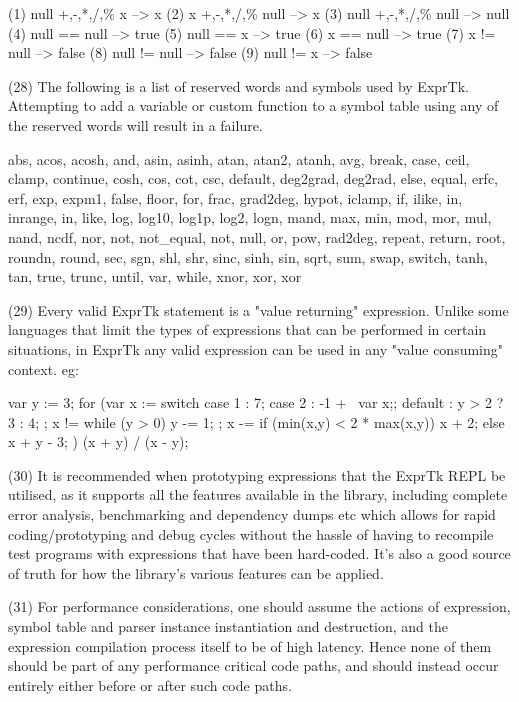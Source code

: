 {(1) null  +,-,*,/,\%  x    --> x
(2) x     +,-,*,/,\%  null --> x
(3) null  +,-,*,/,\%  null --> null
(4) null     ==      null --> true
(5) null     ==      x    --> true
(6) x        ==      null --> true
(7) x        !=      null --> false
(8) null     !=      null --> false
(9) null     !=      x    --> false

(28) The following is a list  of reserved words and symbols  used by
ExprTk. Attempting to  add a variable  or custom function  to a
symbol table using any of  the reserved words will result  in a
failure.

abs, acos, acosh, and, asin, asinh, atan, atan2, atanh, avg,
break, case,  ceil, clamp,  continue, cosh,  cos, cot,  csc,
default,  deg2grad, deg2rad,  else, equal,  erfc, erf,  exp,
expm1, false, floor, for, frac, grad2deg, hypot, iclamp, if,
ilike, in, inrange, in, like, log, log10, log1p, log2, logn,
mand,  max,  min,  mod,  mor,  mul,  nand,  ncdf,  nor, not,
not\_equal,  not,  null, or,  pow,  rad2deg, repeat,  return,
root, roundn, round,  sec, sgn, shl,  shr, sinc, sinh,  sin,
sqrt, sum, swap, switch, tanh, tan, true, trunc, until, var,
while, xnor, xor, xor

(29) Every valid ExprTk statement is a "value returning" expression.
Unlike some languages that limit the types of expressions  that
can be  performed in  certain situations,  in ExprTk  any valid
expression can be used in any "value consuming" context. eg:

var y := 3;
for (var x := switch
{
	case 1  :  7;
	case 2  : -1 + ~{var x{};};
	default :  y > 2 ? 3 : 4;
};
x != while (y > 0) { y -= 1; };
x -= {
	if (min(x,y) < 2 * max(x,y))
	x + 2;
	else
	x + y - 3;
}
)
{
	(x + y) / (x - y);
}

(30) It is recommended when prototyping expressions that the  ExprTk
REPL be utilised, as it supports all the features available  in
the library,  including complete  error analysis,  benchmarking
and   dependency   dumps    etc   which   allows    for   rapid
coding/prototyping  and  debug  cycles  without  the  hassle of
having to  recompile test  programs with  expressions that have
been hard-coded. It's also a  good source of truth for  how the
library's various features can be applied.

(31) For performance considerations,  one should assume  the actions
of expression, symbol  table and parser  instance instantiation
and destruction, and the expression compilation process  itself
to be of high latency. Hence none of them should be part of any
performance  critical  code  paths, and  should  instead  occur
entirely either before or after such code paths.

}
